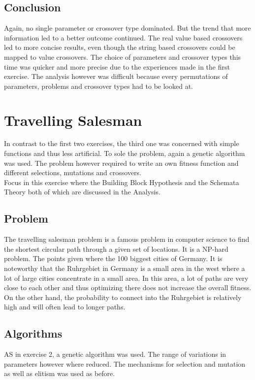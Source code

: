\documentclass{scrartcl}
\begin{document}
\subsection{Conclusion}
Again, no single parameter or crossover type dominated. But the trend that more information led to a better outcome continued. The real value based crossovers led to more concise results, even though the string based crossovers could be mapped to value crossovers. The choice of parameters and crossover types this time was quicker and more precise due to the experiences made in the first exercise. The analysis however was difficult because every permutations of parameters, problems and crossover types had to be looked at.


\section{Travelling Salesman}
In contrast to the first two exercises, the third one was concerned with simple functions and thus less artificial. To sole the problem, again a genetic algorithm was used. The problem however required to write an own fitness function and different selections, mutations and crossovers.\\
Focus in this exercise where the Building Block Hypothesis and the Schemata Theory both of which are discussed in the Analysis.

\subsection{Problem}

The travelling salesman problem is a famous problem in computer science to find the shortest circular path through a given set of locations. It is a NP-hard problem. The points given where the 100 biggest cities of Germany. It is noteworthy that the Ruhrgebiet in Germany is a small area in the west where a lot of large cities concentrate in a small area. In this area, a lot of paths are very close to each other and thus optimizing there does not increase the overall fitness. On the other hand, the probability to connect into the Ruhrgebiet is relatively high and will often lead to longer paths.

\subsection{Algorithms}
AS in exercise 2, a genetic algorithm was used. The range of variations in parameters however where reduced. The mechanisms for selection and mutation as well as elitism was used as before.
\end{document}
